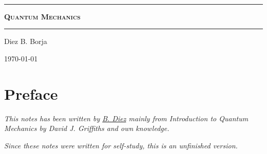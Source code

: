 \documentclass[letterpaper, onecolumn, 11pt]{report}\
\begin{document}
\sffamily
\begin{center}

\

\vspace{6.5cm}

\rule{15cm}{0.1cm}

\vspace{1.5cm}

{\huge \textsc{\textbf{Quantum Mechanics}}}

\vspace{1.5cm}

\rule{15cm}{0.1cm}

\vspace{1.5cm}
Diez B. Borja


\today

\newpage
\setcounter{page}{1}

\pagestyle{plain}
\chapter*{Preface}
\bigskip
\bigskip
\bigskip
\bigskip
\bigskip
\bigskip


\emph{This notes has been written by \href{https://github.com/10BlackHole}{B. Diez} mainly from Introduction to Quantum Mechanics by David J. Griffiths and own knowledge.}

\emph{Since these notes were written for self-study, this is an unfinished version.}
\end{center}
\tableofcontents
{}
\setcounter{page}{1}







\end{document}
